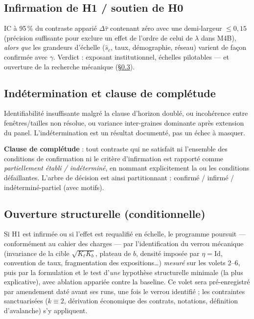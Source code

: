 \documentclass[11pt,a4paper]{article}
\begin{document}
\subsection{Infirmation de H1 / soutien de H0}

IC à 95\,\% du contraste apparié $\Delta\hat\tau$ contenant zéro avec une
demi-largeur $\le0{,}15$ (précision suffisante pour exclure un effet de
l'ordre de celui de $\lambda$ dans M4B), \emph{alors que} les grandeurs
d'échelle ($\hat s_c$, taux, démographie, réseau) varient de façon
confirmée avec $\gamma$. Verdict : exposant institutionnel, échelles
pilotables --- et ouverture de la recherche mécanique (§\ref{sec:ouverture}).

\subsection{Indétermination et clause de complétude}

Identifiabilité insuffisante malgré la clause d'horizon doublé, ou
incohérence entre fenêtres/tailles non résolue, ou variance inter-graines
dominante après extension du panel. L'indétermination est un résultat
documenté, pas un échec à masquer.

\textbf{Clause de complétude} : tout contraste qui ne satisfait ni
l'ensemble des conditions de confirmation ni le critère d'infirmation est
rapporté comme \emph{partiellement établi / indéterminé}, en nommant
explicitement la ou les conditions défaillantes. L'arbre de décision est
ainsi partitionnant : confirmé / infirmé / indéterminé-partiel (avec
motifs).

\subsection{Ouverture structurelle (conditionnelle)}
\label{sec:ouverture}

Si H1 est infirmée ou si l'effet est requalifié en échelle, le programme
poursuit --- conformément au cahier des charges --- par l'identification
du verrou mécanique (invariance de la cible $\sqrt{K_\ell K_b}$, plateau
de $b$, densité imposée par $\eta=\mathrm{Id}$, convention de taux,
fragmentation des expositions\dots) \emph{mesuré} sur les volets 2--6,
puis par la formulation et le test d'\emph{une} hypothèse structurelle
minimale (la plus explicative), avec ablation appariée contre la baseline.
Ce volet sera pré-enregistré par amendement daté avant ses runs, une fois
le verrou identifié ; les contraintes sanctuarisées ($k\equiv2$, dérivation
économique des contrats, notations, définition d'avalanche) s'y appliquent.
\end{document}
